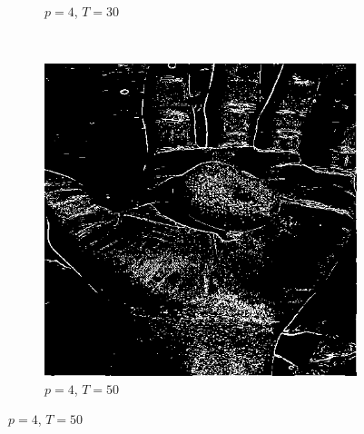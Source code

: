 \documentclass{article}
\begin{document}
\begin{enumerate}[label=(\alph*)]
\begin{figure}
\begin{subfigure}[b]{0.3\textwidth}
            \caption{$p = 4$, $T = 30$}
        \end{subfigure}
        ~
        \begin{subfigure}[b]{0.3\textwidth}
            \includegraphics[width=\textwidth]{img/ED1_4_50.png}
            \caption{$p = 4$, $T = 50$}
        \end{subfigure}
        
        

\end{figure}
\end{enumerate}
\end{document}
